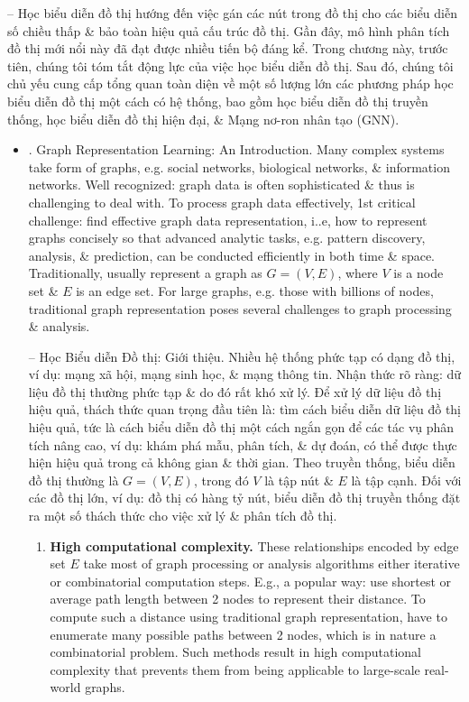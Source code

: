 \documentclass{article}
\begin{document}
\begin{itemize}
    -- Học biểu diễn đồ thị hướng đến việc gán các nút trong đồ thị cho các biểu diễn số chiều thấp \& bảo toàn hiệu quả cấu trúc đồ thị. Gần đây, mô hình phân tích đồ thị mới nổi này đã đạt được nhiều tiến bộ đáng kể. Trong chương này, trước tiên, chúng tôi tóm tắt động lực của việc học biểu diễn đồ thị. Sau đó, chúng tôi chủ yếu cung cấp tổng quan toàn diện về một số lượng lớn các phương pháp học biểu diễn đồ thị một cách có hệ thống, bao gồm học biểu diễn đồ thị truyền thống, học biểu diễn đồ thị hiện đại, \& Mạng nơ-ron nhân tạo (GNN).
    \begin{itemize}
        \item {. Graph Representation Learning: An Introduction.} Many complex systems take form of graphs, e.g. social networks, biological networks, \& information networks. Well recognized: graph data is often sophisticated \& thus is challenging to deal with. To process graph data effectively, 1st critical challenge: find effective graph data representation, i..e, how to represent graphs concisely so that advanced analytic tasks, e.g. pattern discovery, analysis, \& prediction, can be conducted efficiently in both time \& space. Traditionally, usually represent a graph as $G = (V,E)$, where $V$ is a node set \& $E$ is an edge set. For large graphs, e.g. those with billions of nodes, traditional graph representation poses several challenges to graph processing \& analysis.

        -- {\sf Học Biểu diễn Đồ thị: Giới thiệu.} Nhiều hệ thống phức tạp có dạng đồ thị, ví dụ: mạng xã hội, mạng sinh học, \& mạng thông tin. Nhận thức rõ ràng: dữ liệu đồ thị thường phức tạp \& do đó rất khó xử lý. Để xử lý dữ liệu đồ thị hiệu quả, thách thức quan trọng đầu tiên là: tìm cách biểu diễn dữ liệu đồ thị hiệu quả, tức là cách biểu diễn đồ thị một cách ngắn gọn để các tác vụ phân tích nâng cao, ví dụ: khám phá mẫu, phân tích, \& dự đoán, có thể được thực hiện hiệu quả trong cả không gian \& thời gian. Theo truyền thống, biểu diễn đồ thị thường là $G = (V,E)$, trong đó $V$ là tập nút \& $E$ là tập cạnh. Đối với các đồ thị lớn, ví dụ: đồ thị có hàng tỷ nút, biểu diễn đồ thị truyền thống đặt ra một số thách thức cho việc xử lý \& phân tích đồ thị.
        \begin{enumerate}
            \item {\bf High computational complexity.} These relationships encoded by edge set $E$ take most of graph processing or analysis algorithms either iterative or combinatorial computation steps. E.g., a popular way: use shortest or average path length between 2 nodes to represent their distance. To compute such a distance using traditional graph representation, have to enumerate many possible paths between 2 nodes, which is in nature a combinatorial problem. Such methods result in high computational complexity that prevents them from being applicable to large-scale real-world graphs.


\end{enumerate}
\end{itemize}
\end{itemize}
\end{document}
